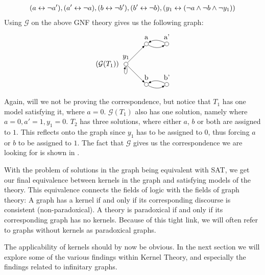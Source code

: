 \begin{example}
  \begin{align}
    ( a \leftrightarrow \neg a'), (a' \leftrightarrow \neg a), (b \leftrightarrow \neg b'), (b' \leftrightarrow \neg b), (y_1 \leftrightarrow (\neg a \wedge \neg b \wedge \neg y_1))
  \end{align}
  Using $\mathcal{G}$ on the above GNF theory gives us the following graph:
  \[
    \begin{tikzpicture}
      [
      point/.style={circle,draw,inner sep=0pt,minimum size=2mm},
      collection/.style={thick,rectangle,draw,inner sep=0pt,minimum height=14mm, minimum width= 9mm}
      ]
      \node (label) at (5,1) [label=left:$(\mathcal{G}(T_1))\;$] {};
      \node (0) at (5,1) [point,label=above:$y_1$] {};
      \node (1) at (6,0) [point,label=above:b] {};
      \node (2) at (7,0) [point,label=above:b'] {};
      \node (3) at (6,2) [point,label=above:a] {};
      \node (4) at (7,2) [point,label=above:a'] {};
      \draw [-latex, loop below] (0) to (0);
      \draw [-latex] (0) to (1);
      \draw [-latex, bend right] (1) to (2);
      \draw [-latex, bend right] (2) to (1);
      \draw [-latex] (0) to (3);
      \draw [-latex, bend right] (3) to (4);
      \draw [-latex, bend right] (4) to (3);
    \end{tikzpicture}
  \]
\end{example}
Again, will we not be proving the correspondence, but notice that $T_1$ has one model satisfying it, where $a = 0$.
$\mathcal{G}(T_1)$ also has one solution, namely where $a = 0, a' = 1, y_1 = 0$.
$T_2$ has three solutions, where either $a$, $b$ or both are assigned to $1$.
This reflects onto the graph since $y_1$ has to be assigned to $0$, thus forcing $a$ or $b$ to be assigned to $1$.
The fact that $\mathcal{G}$ gives us the correspondence we are looking for is shown in \cite{apal-digraph}.

With the problem of solutions in the graph being equivalent with SAT, we get our final equivalence between kernels in the graph and satisfying models of the theory.
This equivalence connects the fields of logic with the fields of graph theory:
A graph has a kernel if and only if its corresponding discourse is consistent (non-paradoxical).
A theory is paradoxical if and only if its corresponding graph has no kernels.
Because of this tight link, we will often refer to graphs without kernels as paradoxical graphs.

The applicability of kernels should by now be obvious.
In the next section we will explore some of the various findings within Kernel Theory, and especially the findings related to infinitary graphs.
